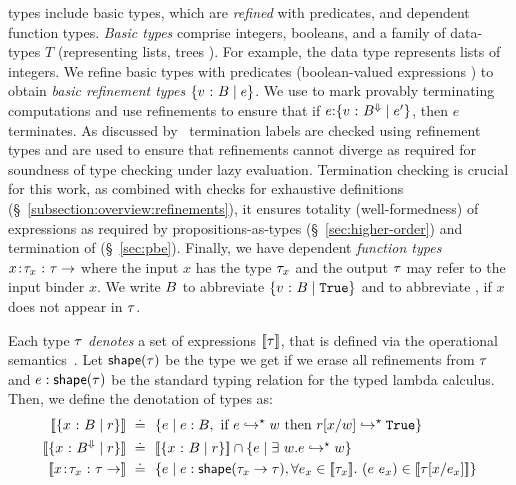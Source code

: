 \corelan types include basic types, which are \emph{refined} with predicates,
and dependent function types.
%
\emph{Basic types} \btyp comprise integers, booleans, and a family of data-types
$T$ (representing lists, trees \etc).
%
For example, the data type \tintlist represents lists of integers.
%
We refine basic types with predicates (boolean-valued expressions ) to obtain
\emph{basic refinement types} $\{ {v} \ \text{:}\ {B} \mid e \}$.
%
%
We use \tlabel to mark provably terminating
computations and use
refinements to ensure that if
${{e}\text{:}{\ensuremath{\{ {v} \ \text{:}\ {B^\Downarrow} \mid e' \}}}}$,
then $e$ terminates.
%
As discussed by~\citet{Vazou14} termination labels
are checked using refinement types and are used
to ensure that refinements cannot diverge as required
for soundness of type checking under lazy evaluation.
%
Termination checking is crucial for this work,
as combined with checks for exhaustive definitions (\S~\ref{subsection:overview:refinements}),
it ensures totality (well-formedness)
of expressions as required by
propositions-as-types (\S~\ref{sec:higher-order})
and termination of \pbesym (\S~\ref{sec:pbe}).
%
Finally, we have dependent \emph{function types} $\trfun{x}{\typ_x}{\typ}$
where the input $x$ has the type $\tau_x$ and the output $\tau$ may
refer to the input binder $x$.
%
We write $B$ to abbreviate $\{ {v} \ \text{:}\ {B} \mid \texttt{True} \}$
and  to abbreviate , if
$x$ does not appear in $\tau$.
%

%
Each type $\tau$ \emph{denotes} a set of expressions $[\![\tau]\!]$,
that is defined via the operational semantics~\cite{Knowles10}.
%
Let $\mathsf{shape}(\tau)$ be the type we get if we erase all refinements
from $\tau$ and $e : \mathsf{shape}(\tau)$ be the
standard typing relation for the typed lambda calculus.
%
Then, we define the denotation of types as:
%
\begin{align*}
\interp{\tref{x}{\btyp}{r}} \defeq &\
  \{ e \mid  \bhastype{}{e}{\btyp}
           , \mbox{ if } \evalsto{e}{w} \mbox{ then } \evalsto{r\subst{x}{w}}{\etrue}
  \}\\
\interp{\tref{x}{\btyp^\tlabel}{r}} \defeq &\
  \interp{\tref{x}{\btyp}{r}} \cap \{ e \mid  \exists\ w. \evalsto{e}{w}\}\\
\interp{\trfun{x}{\typ_x}{\typ}} \defeq &\
  \{ e \mid \bhastype{}{e}{\shape{\tfunbasic{\typ_x}{\typ}}}
           , \forall e_x \in \interp{\typ_x}.\ (\eapp{e}{e_x}) \in \interp{\typ\subst{x}{e_x}}
  \}
\end{align*}
%

